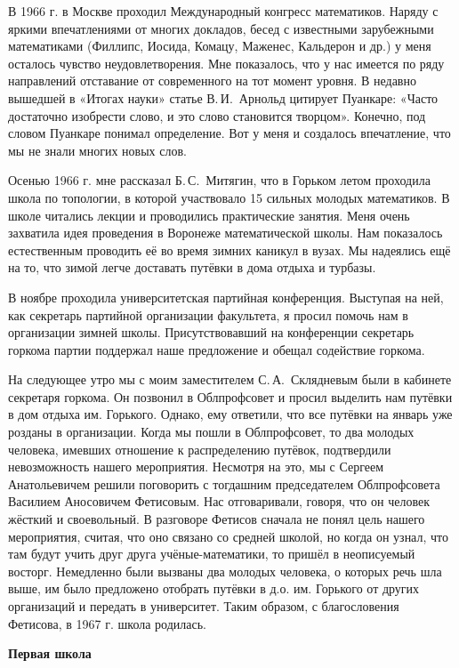 В 1966 г. в Москве проходил Международный конгресс математиков. Наряду с яркими впечатлениями от многих докладов, бесед с известными зарубежными математиками (Филлипс, Иосида, Комацу, Маженес, Кальдерон и др.) у меня осталось чувство неудовлетворения. Мне показалось, что у нас имеется по ряду направлений отставание от современного на тот момент уровня. В недавно вышедшей в «Итогах науки» статье В.\,И.~Арнольд цитирует Пуанкаре: «Часто достаточно изобрести слово, и это слово становится творцом». Конечно, под словом Пуанкаре понимал определение. Вот у меня и создалось впечатление, что мы не знали многих новых слов.

Осенью 1966 г. мне рассказал Б.\,С.~Митягин, что в Горьком летом проходила школа по топологии, в которой участвовало 15 сильных молодых математиков. В школе читались лекции и проводились практические занятия. Меня очень захватила идея проведения в Воронеже математической школы.
Нам показалось естественным проводить её во время зимних каникул в вузах. Мы надеялись ещё на то, что зимой легче доставать путёвки в дома отдыха и турбазы.

В ноябре проходила университетская партийная конференция. Выступая на ней, как секретарь партийной организации факультета, я просил помочь нам в организации зимней школы. Присутствовавший на конференции секретарь горкома партии поддержал наше предложение и обещал содействие горкома.

На следующее утро мы с моим заместителем С.\,А.~Скля\-дневым были в кабинете секретаря горкома.
Он позвонил в Облпрофсовет и просил выделить нам путёвки в дом отдыха им. Горького.
Однако, ему ответили, что все путёвки на январь уже розданы в организации. Когда мы пошли в Облпрофсовет, то два молодых человека, имевших отношение к распределению путёвок, подтвердили невозможность нашего мероприятия. Несмотря на это, мы с Сергеем Анатольевичем решили поговорить с тогдашним председателем Облпрофсовета Василием Аносовичем Фетисовым. Нас отговаривали, говоря, что он человек жёсткий и своевольный. В разговоре Фетисов сначала не понял цель нашего мероприятия, считая, что оно связано со средней школой, но когда он
узнал, что там будут учить друг друга учёные-математики, то пришёл в неописуемый восторг. Немедленно были вызваны два молодых человека, о которых речь шла выше, им было предложено отобрать путёвки в д.о. им. Горького от других организаций и передать в университет. Таким образом, с благословения Фетисова, в 1967 г. школа родилась.

{\bf Первая школа}

